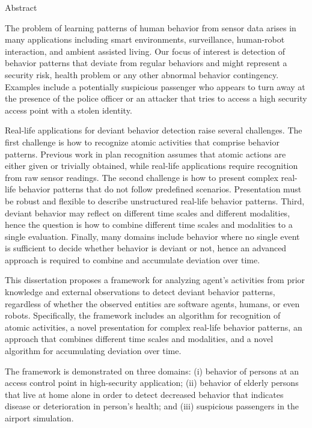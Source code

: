 
\begin{preliminary}{Abstract} 

\vspace{-1mm}

\noindent
The problem of learning patterns of human behavior from sensor data arises in many applications including smart environments, surveillance, human-robot interaction, and ambient assisted living. Our focus of interest is detection of behavior patterns that deviate from regular behaviors and might represent a security risk, health problem or any other abnormal behavior contingency. Examples include a potentially suspicious passenger who appears to turn away at the presence of the police officer or an attacker that tries to access a high security access point with a stolen identity.


Real-life applications for deviant behavior detection raise several challenges. The first challenge is how to recognize atomic activities that comprise behavior patterns. Previous work in plan recognition assumes that atomic actions are either given or trivially obtained, while real-life applications require recognition from raw sensor readings. The second challenge is how to present complex real-life behavior patterns that do not follow predefined scenarios. Presentation must be robust and flexible to describe unstructured real-life behavior patterns. Third, deviant behavior may reflect on different time scales and different modalities, hence the question is how to combine different time scales and modalities to a single evaluation. Finally, many domains include behavior where no single event is sufficient to decide whether behavior is deviant or not, hence an advanced approach is required to combine and accumulate deviation over time. 

This dissertation proposes a framework for analyzing agent's activities from prior knowledge and external observations to detect deviant behavior patterns, regardless of whether the observed entities are software agents, humans, or even robots. Specifically, the framework includes an algorithm for recognition of atomic activities, a novel presentation for complex real-life behavior patterns, an approach that combines different time scales and modalities, and a novel algorithm for accumulating deviation over time.

The framework is demonstrated on three domains: (i) behavior of persons at an access control point in high-security application; (ii) behavior of elderly persons that live at home alone in order to detect decreased behavior that indicates disease or deterioration in person's health; and (iii) suspicious passengers in the airport simulation. 


\end{preliminary} 

